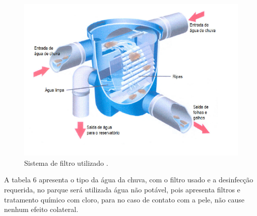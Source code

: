 \begin{figure}[H]
	 \centering
	\label{Sistema de filtro utilizado}
	 \includegraphics[scale=0.6]{captacao/10.png}
	 \caption{Sistema de filtro utilizado \cite{ECOCASA} .}
\end{figure}

A tabela 6 apresenta o tipo da água da chuva, com o filtro usado e a desinfecção requerida, no parque será utilizada água não potável, pois apresenta filtros e tratamento químico com cloro, para no caso de contato com a pele, não cause nenhum efeito colateral.

